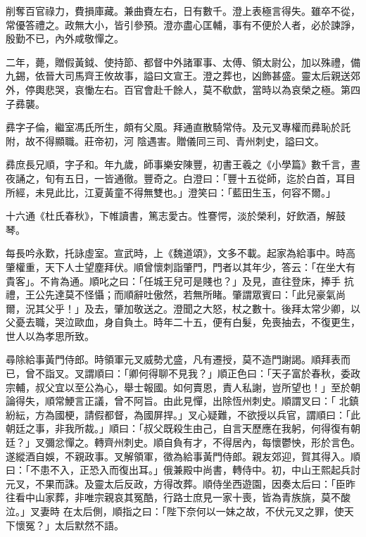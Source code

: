 \begin{pinyinscope}
 削奪百官祿力，費損庫藏。兼曲賚左右，日有數千。澄上表極言得失。雖卒不從，常優答禮之。政無大小，皆引參預。澄亦盡心匡輔，事有不便於人者，必於諫諍，殷勤不已，內外咸敬憚之。



 二年，薨，贈假黃鉞、使持節、都督中外諸軍事、太傅、領太尉公，加以殊禮，備九錫，依晉大司馬齊王攸故事，謚曰文宣王。澄之葬也，凶飾甚盛。靈太后親送郊外，停輿悲哭，哀慟左右。百官會赴千餘人，莫不欷歔，當時以為哀榮之極。第四子彞襲。



 彞字子倫，繼室馮氏所生，頗有父風。拜通直散騎常侍。及元叉專權而彞恥於託附，故不得顯職。莊帝初，河
 陰遇害。贈儀同三司、青州刺史，謚曰文。



 彞庶長兄順，字子和。年九歲，師事樂安陳豐，初書王羲之《小學篇》數千言，晝夜誦之，旬有五日，一皆通徹。豐奇之。白澄曰：「豐十五從師，迄於白首，耳目所經，未見此比，江夏黃童不得無雙也。」澄笑曰：「藍田生玉，何容不爾。」



 十六通《杜氏春秋》，下帷讀書，篤志愛古。性謇愕，淡於榮利，好飲酒，解鼓琴。



 每長吟永歎，托詠虛室。宣武時，上《魏道頌》，文多不載。起家為給事中。時高肇權重，天下人士望塵拜伏。順曾懷刺詣肇門，門者以其年少，答云：「在坐大有貴客」。不肯為通。順叱之曰：「任城王兒可是賤也？」及見，直往登床，捧手
 抗禮，王公先達莫不怪懾；而順辭吐傲然，若無所睹。肇謂眾賓曰：「此兒豪氣尚爾，況其父乎！」及去，肇加敬送之。澄聞之大怒，杖之數十。後拜太常少卿，以父憂去職，哭泣歐血，身自負土。時年二十五，便有白髮，免喪抽去，不復更生，世人以為孝思所致。



 尋除給事黃門侍郎。時領軍元叉威勢尤盛，凡有遷授，莫不造門謝謁。順拜表而已，曾不詣叉。叉謂順曰：「卿何得聊不見我？」順正色曰：「天子富於春秋，委政宗輔，叔父宜以至公為心，舉士報國。如何賣恩，責人私謝，豈所望也！」至於朝論得失，順常鯁言正議，曾不阿旨。由此見憚，出除恆州刺史。順謂叉曰：「
 北鎮紛紜，方為國梗，請假都督，為國屏捍。」叉心疑難，不欲授以兵官，謂順曰：「此朝廷之事，非我所裁。」順曰：「叔父既殺生由己，自言天歷應在我躬，何得復有朝廷？」叉彌忿憚之。轉齊州刺史。順自負有才，不得居內，每懷鬱怏，形於言色。遂縱酒自娛，不親政事。叉解領軍，徵為給事黃門侍郎。親友郊迎，賀其得入。順曰：「不患不入，正恐入而復出耳。」俄兼殿中尚書，轉侍中。初，中山王熙起兵討元叉，不果而誅。及靈太后反政，方得改葬。順侍坐西遊園，因奏太后曰：「臣昨往看中山家葬，非唯宗親哀其冤酷，行路士庶見一家十喪，皆為青族旐，莫不酸泣。」叉妻時
 在太后側，順指之曰：「陛下奈何以一妹之故，不伏元叉之罪，使天下懷冤？」太后默然不語。




\end{pinyinscope}
